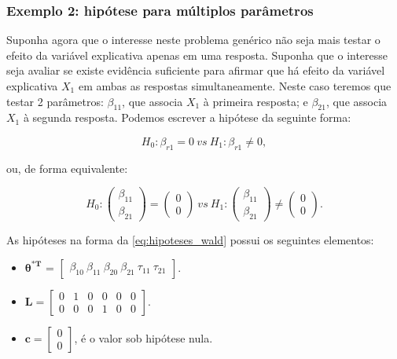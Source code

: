 \documentclass[AMA,STIX1COL]{WileyNJD-v2}
\begin{document}
\subsubsection{Exemplo 2: hipótese para múltiplos parâmetros}\label{sec:ex2}

Suponha agora que o interesse neste problema genérico não seja mais testar o efeito da variável explicativa apenas em uma resposta. Suponha que o interesse seja avaliar se existe evidência suficiente para afirmar que há efeito da variável explicativa $X_1$ em ambas as respostas simultaneamente. Neste caso teremos que testar 2 parâmetros: $\beta_{11}$, que associa $X_1$ à primeira resposta; e $\beta_{21}$, que associa $X_1$ à segunda resposta. Podemos escrever a hipótese da seguinte forma:

\begin{equation}
\label{eq:ex2}
H_0: \beta_{r1} = 0 \ vs \ H_1: \beta_{r1} \neq 0,
\end{equation}

\noindent ou, de forma equivalente:

$$
H_0: 
\begin{pmatrix}
\beta_{11} \\ 
\beta_{21}
\end{pmatrix} 
= 
\begin{pmatrix}
0 \\ 
0
\end{pmatrix}
\ vs \ 
H_1: 
\begin{pmatrix}
\beta_{11} \\ 
\beta_{21}
\end{pmatrix} 
\neq
\begin{pmatrix}
0 \\ 
0 
\end{pmatrix}.
$$

As hipóteses na forma da \autoref{eq:hipoteses_wald} possui os seguintes elementos:

\begin{itemize}
  
  \item $\boldsymbol{\theta^{*T}}$ = $\begin{bmatrix} \beta_{10} \  \beta_{11} \ \beta_{20} \ \beta_{21} \ \tau_{11} \ \tau_{21} \end{bmatrix}$.


\item $\boldsymbol{L} = \begin{bmatrix} 0 & 1 & 0 & 0 & 0 & 0 \\
0 & 0 & 0 & 1 & 0 & 0 \end{bmatrix}.$
 
\item $\boldsymbol{c} = \begin{bmatrix} 0 \\ 0 \end{bmatrix}$, é o valor sob hipótese nula. 

\end{itemize}
\end{document}
